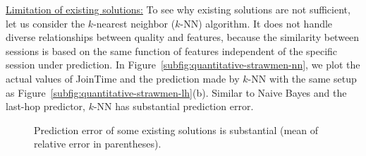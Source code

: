 \noindent\underline{Limitation of existing solutions:}
To see why existing solutions are not sufficient, 
let us consider the $k$-nearest neighbor ($k$-NN) algorithm.
It does not handle diverse relationships between quality
and features, because the similarity between sessions
is based on the same function of features
independent of the specific session under prediction.
In Figure~\ref{subfig:quantitative-strawmen-nn},
we plot the actual values of JoinTime and the 
prediction made by $k$-NN with the same setup as 
Figure~\ref{subfig:quantitative-strawmen-lh}(b).
Similar to Naive Bayes and the last-hop predictor, 
$k$-NN has substantial prediction error.


\begin{figure}[t!]
\centering
{}
\caption{Prediction error of some existing solutions 
is substantial (mean of relative error in parentheses).}
\label{fig:quantitative-strawmen}
\end{figure}




